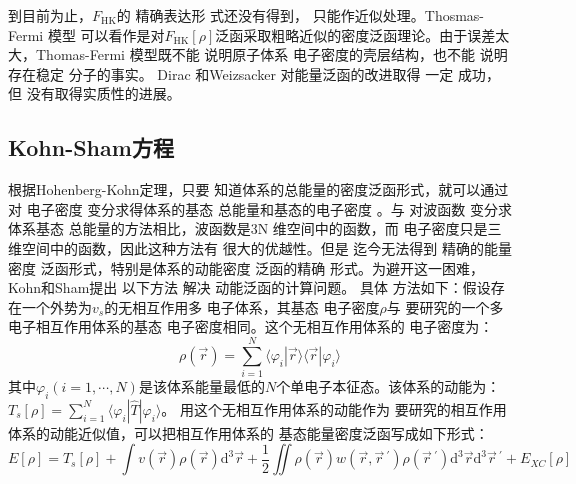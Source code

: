 {到目前为止，$F_{\mathrm{HK}}$的%
{精确表达形}
式还没有得到，%
{只能作近似处理}。Thosmas-Fermi%
{模型}%
{可以看作是对$F_{\mathrm{HK}}[\rho]$泛函采取粗略近似的密度泛函理论。由于误差太}大，Thomas-Fermi%
{模型}既不能%
{说明}原子体系%
电子密度的壳层结构，也不能%
{说明存在}稳定%
分子{的事实}。%
Dirac%
和Weizsacker%
对能量泛函的改进取得%
一定%
{成功}，但%
{没有取得实质性的进展}。

\subsection{Kohn-Sham方程}
{根据}Hohenberg-Kohn定理，只要%
{知道}体系的总能量的{密度}泛函形式，就可以通过对%
{电}子密度%
变分求得体系的基态%
{总能量和基态的电}子密度%
。与%
对波函数%
变分求%
体系基态%
{总能量}的方法相比，波函数是3N%
{维空间中的}函数，而%
{电}子密度只是三维{空间中的}函数，因此这种方法有%
{很}大的优越性。但是%
{迄今无法}得到%
精确的能量密度
泛函形式，特别是体系的动能密度
泛函的精确%
{形式。为避开这一困难}，Kohn和Sham\cite{PR140-A1133_1965}提出%
{以下}方法%
解决%
动能泛函的计算问题。%
具体%
方法如下：假设存在一个外势为$v_s$的无相互作用多%
{电}子体系，其基态%
{电}子密度$\rho$与%
{要}研究的一个多电子相互作用体系的基态%
{电}子密度相同。这个无相互作用体系的%
{电}子密度为：
$$\rho(\vec{r})=\sum_{i=1}^{N}\langle\varphi_{i}|\vec{r}\rangle\langle\vec{r}|\varphi_{i}\rangle$$
其中$\varphi_i(i\!=\!1,\cdots,N)$是该体系能量最低的$N$个{单电子}本征态。该体系的动能为：\linebreak $T_{s}[\rho]\!=\!\sum\limits_{i=1}^{N}\langle\varphi_{i}|\hat{T}|\varphi_{i}\rangle$。
用这个无相互作用体系的动能作为%
{要}研究的相互作用体系的动能近似{值}，可以把相互作用体系的%
{基态能量密度泛函}写成如下形式：
\begin{equation}
  \label{eq:dft-1}
E[\rho]=T_{s}[\rho]+\int{v(\vec{r})\rho(\vec{r})\textrm{d}^3\vec{r}}+\frac 12\iint{\rho(\vec{r})w(\vec{r},\vec r\,^{\prime})\rho(\vec r\,^{\prime})\textrm{d}^3\vec{r}\textrm{d}^3\vec r\,^{\prime}}+E_{XC}[\rho]
\end{equation}
}
